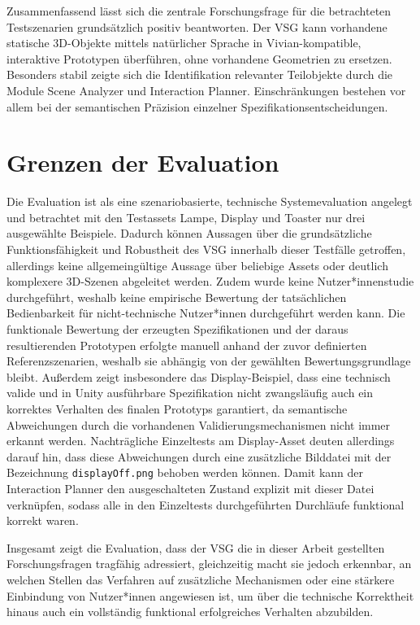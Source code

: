 Zusammenfassend lässt sich die zentrale Forschungsfrage für die betrachteten Testszenarien grundsätzlich positiv beantworten. Der VSG kann vorhandene statische 3D-Objekte mittels natürlicher Sprache in Vivian-kompatible, interaktive Prototypen überführen, ohne vorhandene Geometrien zu ersetzen. Besonders stabil zeigte sich die Identifikation relevanter Teilobjekte durch die Module Scene Analyzer und Interaction Planner. Einschränkungen bestehen vor allem bei der semantischen Präzision einzelner Spezifikationsentscheidungen.


\section{Grenzen der Evaluation}

Die Evaluation ist als eine szenariobasierte, technische Systemevaluation angelegt und betrachtet mit den Testassets Lampe, Display und Toaster nur drei ausgewählte Beispiele. Dadurch können Aussagen über die grundsätzliche Funktionsfähigkeit und Robustheit des VSG innerhalb dieser Testfälle getroffen, allerdings keine allgemeingültige Aussage über beliebige Assets oder deutlich komplexere 3D-Szenen abgeleitet werden. Zudem wurde keine Nutzer*innenstudie durchgeführt, weshalb keine empirische Bewertung der tatsächlichen Bedienbarkeit für nicht-technische Nutzer*innen durchgeführt werden kann. Die funktionale Bewertung der erzeugten Spezifikationen und der daraus resultierenden Prototypen erfolgte manuell anhand der zuvor definierten Referenzszenarien, weshalb sie abhängig von der gewählten Bewertungsgrundlage bleibt. Außerdem zeigt insbesondere das Display-Beispiel, dass eine technisch valide und in Unity ausführbare Spezifikation nicht zwangsläufig auch ein korrektes Verhalten des finalen Prototyps garantiert, da semantische Abweichungen durch die vorhandenen Validierungsmechanismen nicht immer erkannt werden.
Nachträgliche Einzeltests am Display-Asset deuten allerdings darauf hin, dass diese Abweichungen durch eine zusätzliche Bilddatei mit der Bezeichnung \texttt{displayOff.png} behoben werden können. Damit kann der Interaction Planner den ausgeschalteten Zustand explizit mit dieser Datei verknüpfen, sodass alle in den Einzeltests durchgeführten Durchläufe funktional korrekt waren.

Insgesamt zeigt die Evaluation, dass der VSG die in dieser Arbeit gestellten Forschungsfragen tragfähig adressiert, gleichzeitig macht sie jedoch erkennbar, an welchen Stellen das Verfahren auf zusätzliche Mechanismen oder eine stärkere Einbindung von Nutzer*innen angewiesen ist, um über die technische Korrektheit hinaus auch ein vollständig funktional erfolgreiches Verhalten abzubilden.
